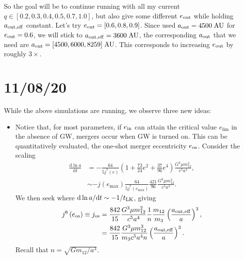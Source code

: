 \documentclass[11pt,
        usenames, %
        dvipsnames %
    ]{article}
\newcommand*{\rd}[2]{\frac{\mathrm{d}#1}{\mathrm{d}#2}}
\newcommand*{\rdil}[2]{\mathrm{d}#1 / \mathrm{d}#2}
\newcommand*{\p}[1]{\left(#1\right)}
\begin{document}
So the goal will be to continue running with all my current $q \in [0.2, 0.3,
0.4, 0.5, 0.7, 1.0]$, but also give some different $e_{\rm out}$ while holding
$a_{\rm out, eff}$ constant. Let's try $e_{\rm out} = [0.6, 0.8, 0.9]$. Since
used $a_{\rm out} = 4500\;\mathrm{AU}$ for $e_{\rm out} = 0.6$, we will stick to
$a_{\rm out, eff} = 3600\;\mathrm{AU}$, the corresponding $a_{\rm out}$ that we
need are $a_{\rm out} = [4500, 6000, 8259]\;\mathrm{AU}$. This corresponds to
increasing $e_{\rm out}$ by roughly $3\times$.

\section{11/08/20}

While the above simulations are running, we observe three new ideas:
\begin{itemize}
    \item Notice that, for most parameters, if $e_{\rm in}$ can attain the
        critical value $e_{\lim}$ in the absence of GW, mergers occur when GW
        is turned on. This can be quantitatively evaluated, the one-shot merger
        eccentricity $e_{\rm os}$. Consider the scaling
        \begin{align}
            \rd{\ln a}{t} &= -\frac{64}{5j^7(e)}\p{1 + \frac{73}{24}e^2 +
                \frac{37}{96}e^4}\frac{G^3 \mu m_{12}^2}{c^5a^4},\\
                &\sim -j\p{e_{\max}}\frac{64}{5j^7(e_{\max})}
                    \frac{421}{96} \frac{G^3\mu m_{12}^2}{c^5a^4}.
        \end{align}
        We then seek where $\rdil{\ln a}{t} \sim -1 / t_{\rm LK}$, giving
        \begin{align}
            j^6\p{e_{\rm os}} \equiv j_{\rm os}
                &= \frac{842}{15}\frac{G^3 \mu m_{12}^2}{c^5a^4}
                    \frac{1}{n}\frac{m_{12}}{m_3}\p{\frac{a_{\rm out,
                    eff}}{a}}^3,\\
                &= \frac{842}{15}\frac{G^3 \mu m_{12}^3}{m_3c^5a^4n}
                    \p{\frac{a_{\rm out, eff}}{a}}^3.
        \end{align}
        Recall that $n = \sqrt{Gm_{12} / a^3}$.


\end{itemize}
\end{document}
